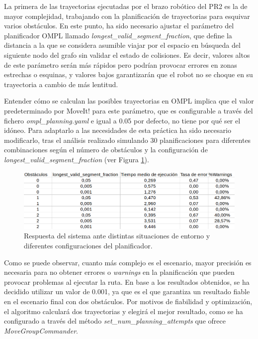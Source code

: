 \documentclass[12pt,spanish,chapterprefix, numbers=noenddot]{book}
\numberwithin{equation}{section}
\numberwithin{figure}{section}
\begin{document}
La primera de las trayectorias ejecutadas por el brazo robótico del PR2 es la de mayor complejidad, trabajando con la planificación de trayectorias para esquivar varios obstáculos. En este punto, ha sido necesario ajustar el parámetro del planificador OMPL llamado \textit{longest\_valid\_segment\_fraction}, que define la distancia a la que se considera asumible viajar por el espacio en búsqueda del siguiente nodo del grafo sin validar el estado de colisiones. Es decir, valores altos de este parámetro serán más rápidos pero podrían provocar errores en zonas estrechas o esquinas, y valores bajos garantizarán que el robot no se choque en su trayectoria a cambio de más lentitud. 

Entender cómo se calculan las posibles trayectorias en OMPL implica que el valor predeterminado por MoveIt! para este parámetro, que es configurable a través del fichero \textit{ompl\_planning.yaml} e igual a 0.05 por defecto, no tiene por qué ser el idóneo. Para adaptarlo a las necesidades de esta práctica ha sido necesario modificarlo, tras el análisis  realizado simulando 30 planificaciones para diferentes combinaciones según el número de obstáculos y la configuración de \textit{longest\_valid\_segment\_fraction}  (ver Figura \ref{fig:analisis_ejecuciones}).

\begin{figure}[hbt!]
\centering
\includegraphics[width=14cm]{Figs/analisis_ejecuciones.png}
\par
\caption{\label{fig:analisis_ejecuciones}Respuesta del sistema ante distintas situaciones de entorno y diferentes configuraciones del planificador.}
\end{figure}

Como se puede observar, cuanto más complejo es el escenario, mayor precisión es necesaria para no obtener errores o \textit{warnings} en la planificación que pueden provocar problemas al ejecutar la ruta. En base a los resultados obtenidos, se ha decidido utilizar un valor de 0.001, ya que es el que garantiza un resultado fiable en el escenario final con dos obstáculos. Por motivos de fiabilidad y optimización, el algoritmo calculará dos trayectorias y elegirá el mejor resultado, como se ha configurado a través del método \textit{set\_num\_planning\_attempts} que ofrece \textit{MoveGroupCommander}. 
\end{document}
